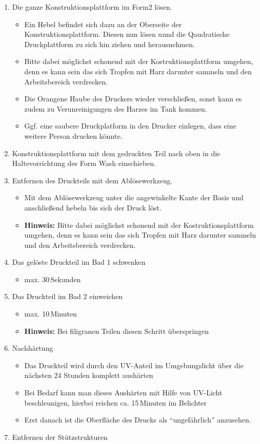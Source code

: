 \documentclass{\basedir/fablab-document}
\begin{document}
\begin{enumerate}
    \item Die ganze Konstruktionsplattform im Form2 lösen.
        \begin{itemize}
            \item Ein Hebel befindet sich dazu an der Oberseite der Konstruktionsplattform. Diesen nun lösen uund die Qaudratische Druckplattform zu sich hin ziehen und herausnehmen.
	    \item Bitte dabei möglichst schonend mit der Kostruktionsplattform umgehen, denn es kann sein das sich Tropfen mit Harz darunter sammeln und den Arbeitsbereich verdrecken.
            \item Die Orangene Haube des Druckers wieder verschließen, sonst kann es zudem zu Verunreinigungen des Harzes im Tank kommen.
	    \item Ggf. eine saubere Druckplatform in den Drucker einlegen, dass eine weitere Person drucken könnte.
        \end{itemize}
    \item Konstruktionsplattform mit dem gedruckten Teil nach oben in die Haltevorrichtung des Form Wash einschieben.
    \item Entfernen des Druckteils mit dem Ablösewerkzeug.
        \begin{itemize}
            \item Mit dem Ablösewerkzeug unter die angewinkelte Kante der Basis und anschließend hebeln bis sich der Druck löst.
            \item \textbf{Hinweis:} Bitte dabei möglichst schonend mit der Kostruktionsplattform umgehen, denn es kann sein das sich Tropfen mit Harz darunter sammeln und den Arbeitsbereich verdrecken.
        \end{itemize}
    \item Das gelöste Druckteil im Bad 1 schwenken
        \begin{itemize}
            \item max. 30\,Sekunden
        \end{itemize}
    \item Das Druckteil im Bad 2 einweichen
        \begin{itemize}
            \item max. 10\,Minuten
            \item \textbf{Hinweis:} Bei filigranen Teilen diesen Schritt überspringen
        \end{itemize}
    \item Nachhärtung
        \begin{itemize}
            \item Das Druckteil wird durch den UV-Anteil im Umgebungslicht über die nächsten 24 Stunden komplett aushärten
            \item Bei Bedarf kann man dieses Aushärten mit Hilfe von UV-Licht beschleunigen, hierbei reichen ca. 15\,Minuten im Belichter
            \item Erst danach ist die Oberfläche des Drucks als \enquote{ungefährlich} anzusehen.
        \end{itemize}
    \item Entfernen der Stützstrukturen


\end{enumerate}
\end{document}
